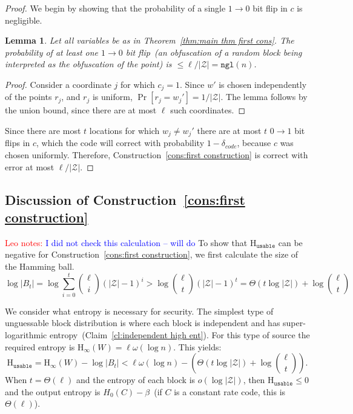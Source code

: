 \documentclass[11pt]{article}
\newcommand{\thref}[1]{\mbox{Theorem~\ref{#1}}}
\newcommand{\clref}[1]{\mbox{Claim~\ref{#1}}}
\newcommand{\consref}[1]{\mbox{Construction~\ref{#1}}}
\newcommand{\dis}{\ensuremath{\mathsf{dis}}}
\newcommand{\ngl}{\ensuremath{\mathtt{ngl}}\xspace}
\newcommand{\Hoo}{\mathrm{H}_\infty}
\newcommand{\Huse}{\mathrm{H}_{\mathtt{usable}}}
\newtheorem{lemma}[theorem]{Lemma}
\newcommand{\authnote}[2]{{\textcolor{red}{\textsf{#1 notes: }\textcolor{blue}{ #2}}\marginpar{\textcolor{red}{\textbf{!!!!!}}}}}
\newcommand{\authnote}[2]{}
\newcommand{\lnote}[1]{{\authnote{Leo}{#1}}}
\begin{document}
\begin{proof}
We begin by showing that the probability of a single $1\rightarrow 0$ bit flip in $c$ is negligible.
\begin{lemma}
\label{lem:no 1 to 0 flips}
Let all variables be as in \thref{thm:main thm first cons}.
The probability of at least one $1\rightarrow 0$ bit flip~(an obfuscation of a random block being interpreted as the obfuscation of the point) is $ \le \ell/|\mathcal{Z}| = \ngl(n)$.
\end{lemma}
\begin{proof}
Consider a coordinate $j$ for which $c_j=1$. Since $w'$ is chosen independently of the points $r_j$, and $r_j$ is uniform, $\Pr[r_j =w_j']  = 1/|\mathcal{Z}|$. The lemma follows by the union bound, since there are at most $\ell$ such coordinates.
\end{proof}

Since there are most $t$ locations for which $w_j\neq w_j'$ there are at most $t$ $0\rightarrow 1$ bit flips in $c$, which the code will correct with probability $1-\delta_{code}$, because $c$ was chosen uniformly.
Therefore, \consref{cons:first construction} is correct with error at most $\ell/|\mathcal{Z}|$.
\end{proof}


\subsection{Discussion of \consref{cons:first construction}}
\label{sec:discussion}
\lnote{I did not check this calculation -- will do}
To show that $\Huse$ can be negative for \consref{cons:first construction}, we first calculate the size of the Hamming ball.  
\[
\log |B_t| = \log \sum_{i=0}^t {\ell \choose i} (|\mathcal{Z}|-1)^i> \log {\ell \choose t} (|\mathcal{Z}|-1)^t =\Theta(t\log |\mathcal{Z}|) + \log {\ell\choose t}
\]

We consider what entropy is necessary for security.  The simplest type of unguessable block distribution is where each block is independent and has super-logarithmic entropy~(\clref{cl:independent high ent}).  For this type of source the required entropy is $\Hoo(W) = \ell\omega(\log n)$.  This yields:
\[
\Huse = \Hoo(W) - \log |B_t| < \ell \omega(\log n) -\left( \Theta(t\log |\mathcal{Z}|) + \log {\ell \choose t}\right).
\]
When $t =\Theta(\ell)$ and the entropy of each block is $o(\log |\mathcal{Z}|)$, then $\Huse\le 0$ and the output entropy is $H_0(C) -\beta$~(if $C$ is a constant rate code, this is $\Theta(\ell)$).
\end{document}
